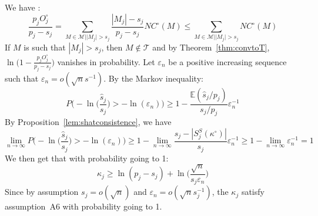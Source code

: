 \documentclass[aos]{imsart}
\theoremstyle{plain}
\newcommand{\E}{\mathbb{E}}
\begin{document}
\begin{supplement}
\begin{equation*}
\end{equation*}
We have :
$$\frac{p_j O^{\circ}_j}{p_j-s_j} =  \sum_{M \in \mathcal{M} | |M_j| > s_j}\frac{|M_j|-s_j}{p_j-s_j}NC^{\circ}(M)\leq \sum_{M \in \mathcal{M} | |M_j| > s_j}NC^{\circ}(M)$$ 
If $M$ is such that $|M_j|>s_j$, then $M\not\in\mathcal{T}$ and by Theorem~\ref{thm:convtoT}, $\ln\Big(1-\frac{p_j O^{\circ}_j}{p_j-s_j}\Big)$ vanishes in probability. 
Let $\varepsilon_n$ be a positive increasing sequence such that $\varepsilon_n=o(\sqrt{n}s^{-1})$. By the Markov inequality:
$$P\Big(-\ln\Big(\frac{\widehat{s}_j}{s_j}\Big)>-\ln(\varepsilon_n)\Big)\geq 1-\frac{\E(\widehat{s}_j/p_j)}{s_j/p_j} \varepsilon_n^{-1} $$
By Proposition~\ref{lem:shatconsistence}, we have
$$\lim_{n\to\infty}P\Big(-\ln\Big(\frac{\widehat{s}_j}{s_j}\Big)>-\ln(\varepsilon_n)\Big)\geq 1-\lim_{n\to\infty}\frac{s_j-|S^S_j(\kappa^{\circ})|}{s_j} \varepsilon_n^{-1} \geq 1-\lim_{n\to\infty}\varepsilon_n^{-1}=1  $$
We then get that with probability going to 1:
\begin{equation}\label{eq:finallowerboundkappaj}
  \kappa_j 
    \geq  \ln(p_j-s_j)+\ln\Big(\frac{\sqrt{n}}{s_j\varepsilon_n}\Big) 
\end{equation}
Since by assumption $s_j=o(\sqrt{n})$ and $\varepsilon_n=o(\sqrt{n}s_j^{-1})$, the $\kappa_j$ satisfy assumption~A6 with probability going to 1.


\end{supplement}
\end{document}
